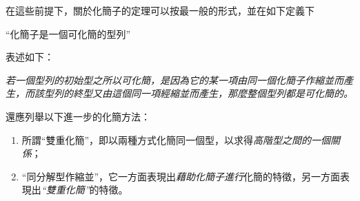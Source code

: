 \documentclass[11pt]{article}
\providecommand{\srcspaced}[1]{\emph{#1}}
\providecommand{\glqq}{“}
\providecommand{\grqq}{”}
\begin{document}
在這些前提下，關於化簡子的定理可以按最一般的形式，並在如下定義下
\begin{center}
\glqq{}化簡子是一個可化簡的型列\grqq{}
\end{center}
表述如下：

\begin{center}
\srcspaced{若一個型列的初始型之所以可化簡，是因為它的某一項由同一個化簡子作縮並而產生，而該型列的終型又由這個同一項經縮並而產生，那麼整個型列都是可化簡的。}
\end{center}

還應列舉以下進一步的化簡方法：
\begin{enumerate}
\item 所謂\glqq{}雙重化簡\grqq{}，即以兩種方式化簡同一個型，以求得\srcspaced{高階型之間的一個關係}；
\item \glqq{}同分解型作縮並\grqq{}，它一方面表現出\srcspaced{藉助化簡子進行}化簡的特徵，另一方面表現出\srcspaced{\glqq{}雙重化簡\grqq{}}的特徵。
\end{enumerate}
\end{document}

